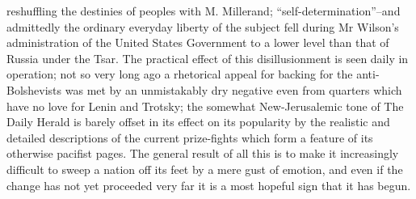 \documentclass{book}
\begin{document}
reshuffling the destinies of peoples with M. Millerand; “self-determination”–and admittedly the ordinary everyday liberty of the subject fell during Mr Wilson’s administration of the United States Government to a lower level than that of Russia under the Tsar. The practical effect of this disillusionment is seen daily in operation; not so very long ago a rhetorical appeal for backing for the anti-Bolshevists was met by an unmistakably dry negative even from quarters which have no love for Lenin and Trotsky; the somewhat New-Jerusalemic tone of The Daily Herald is barely offset in its effect on its popularity by the realistic and detailed descriptions of the current prize-fights which form a feature of its otherwise pacifist pages. The general result of all this is to make it increasingly difficult to sweep a nation off its feet by a mere gust of emotion, and even if the change has not yet proceeded very far it is a most hopeful sign that it has begun.
\end{document}
